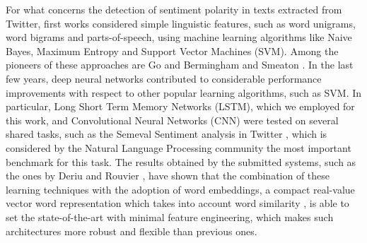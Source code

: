 For what concerns the detection of sentiment polarity in texts extracted from Twitter, first works considered simple linguistic features, such as word unigrams, word bigrams and parts-of-speech, using machine learning algorithms like Naive Bayes, Maximum Entropy and Support Vector Machines (SVM). Among the pioneers of these approaches are Go \etal \cite{go2009twitter} and Bermingham and Smeaton \cite{bermingham2010classifying}.
In the last few years, deep neural networks contributed to considerable performance improvements with respect to other popular learning algorithms, such as SVM. In particular, Long Short Term Memory Networks (LSTM), which we employed for this
work, and Convolutional Neural Networks (CNN) were tested on several shared tasks, such as the Semeval Sentiment analysis in Twitter \cite{NakovRRSS16}, which is
considered by the Natural Language Processing community the most
important benchmark for this task. The results obtained by the
submitted systems, such as the ones by Deriu \etal
\cite{deriu2016swisscheese} and Rouvier \etal \cite{RouvierF16}, have
shown that the combination of these learning techniques with the
adoption of word embeddings, a compact real-value vector word
representation which takes into account word similarity
\cite{MikolovSCCD13} \cite{pennington2014glove}, is able to set the
state-of-the-art with minimal feature engineering,
which makes such architectures more robust and flexible than previous ones. %

